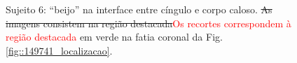  \begin{figure}[H]
\centering
    \hfill
    \caption{Sujeito 6: ``beijo'' na interface entre cíngulo e corpo caloso. \sout{As imagens consistem na região destacada}\textcolor{red}{Os recortes correspondem à região destacada} em verde na fatia coronal da Fig. \ref{fig::149741_localizacao}.
    }
    \label{fig::149741_kissing}
\end{figure}

